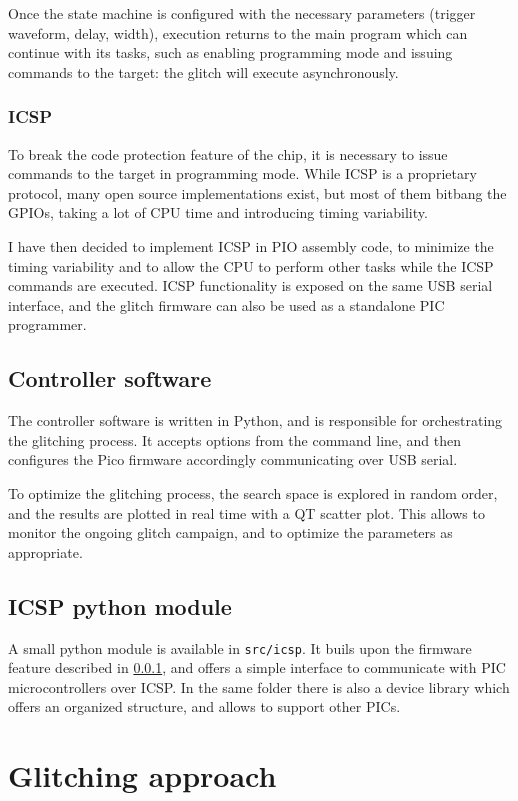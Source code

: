 \documentclass[a4paper,english,twoside,10pt]{article}
\begin{document}
Once the state machine is configured with the necessary parameters (trigger waveform, delay, width), execution returns to the main program which can continue with its tasks, such as enabling programming mode and issuing commands to the target: the glitch will execute asynchronously.

\subsubsection{ICSP}\label{sect:icsp}
To break the code protection feature of the chip, it is necessary to issue commands to the target in programming mode. While ICSP is a proprietary protocol, many open source implementations exist, but most of them bitbang the GPIOs, taking a lot of CPU time and introducing timing variability.

I have then decided to implement ICSP in PIO assembly code, to minimize the timing variability and to allow the CPU to perform other tasks while the ICSP commands are executed. ICSP functionality is exposed on the same USB serial interface, and the glitch firmware can also be used as a standalone PIC programmer.

\subsection{Controller software}
The controller software is written in Python, and is responsible for orchestrating the glitching process. It accepts options from the command line, and then configures the Pico firmware accordingly communicating over USB serial.

To optimize the glitching process, the search space is explored in random order, and the results are plotted in real time with a QT scatter plot. This allows to monitor the ongoing glitch campaign, and to optimize the parameters as appropriate.

\subsection{ICSP python module}
A small python module is available in \texttt{src/icsp}. It buils upon the firmware feature described in \ref{sect:icsp}, and offers a simple interface to communicate with PIC microcontrollers over ICSP. In the same folder there is also a device library which offers an organized structure, and allows to support other PICs.



\section{Glitching approach}
\end{document}
